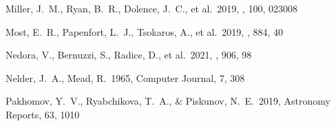 \documentclass[twocolumn,twocolappendix]{aastex63}
\begin{document}
{\begin{thebibliography}{}













 Miller, J.~M., Ryan, B.~R., Dolence, J.~C., et al.\ 2019, \prd, 100, 023008


 Most, E.~R., Papenfort, L.~J., Tsokaros, A., et al.\ 2019, \apj, 884, 40






 Nedora, V., Bernuzzi, S., Radice, D., et al.\ 2021, \apj, 906, 98


 Nelder, J.~A., Mead, R.\ 1965, Computer Journal, 7, 308





 Pakhomov, Y.~V., Ryabchikova, T.~A., \& Piskunov, N.~E.\ 2019, Astronomy Reports, 63, 1010





\end{thebibliography}}
\end{document}
